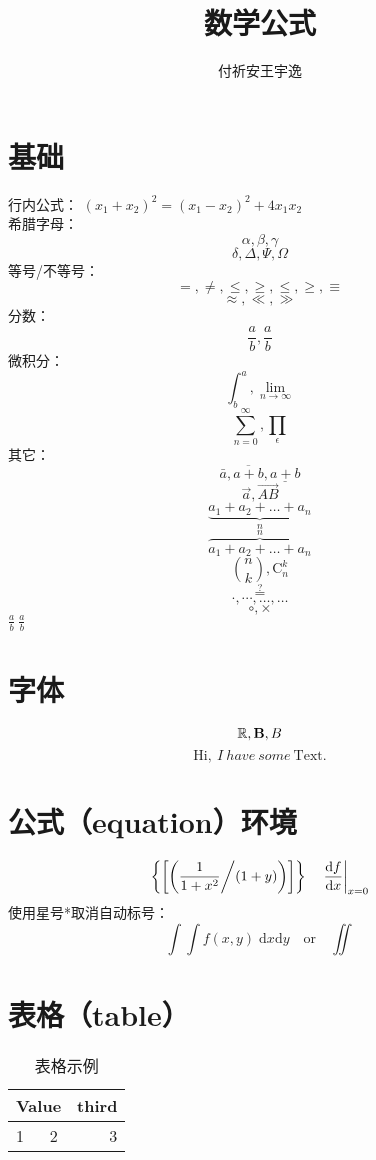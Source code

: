 \documentclass[12pt]{article}
\author{付祈安\quad 王宇逸}
\title{数学公式}
\begin{document}
\maketitle
\tableofcontents
\listoftables

\section{基础}
行内公式：
$ (x_1 + x_2)^2 = (x_1 - x_2)^2 + 4 x_1 x_2 $ \\
希腊字母：
\[ \alpha, \beta, \gamma \]
\[ \delta, \Delta, \Psi, \Omega \]
等号/不等号：
\[ =, \neq, \leq, \geq, \leqslant, \geqslant, \equiv \]
\[ \approx, \ll, \gg \]
分数：
\[ \frac{a}{b}, \frac ab \]
微积分：
\[ \int^a_b, \lim_{n \rightarrow \infty} \]
\[ \sum_{n=0}^{\infty}, \prod_\epsilon \]
其它：
\[ \bar{a}, \overline{a+b}, \underline{a+b} \]
\[ \vec{a}, \overrightarrow{AB} \]
\[ \underbrace{a_1+a_2+\ldots+a_n}_n \]
\[ \overbrace{a_1+a_2+\ldots+a_n}^n \]
\[ \binom{n}{k}, \mathrm{C}_n^k \]
\[ \stackrel{?}{=} \]
\[ \cdot, \cdots, \dots, \ldots \]
\[ \circ, \times \]
$ \frac ab\ {\displaystyle \frac ab} $
\section{字体}
\[ \mathbb{R}, \mathbf{B}, \boldmath{B} \]
\[ \mathrm{Hi},\ I\ have\ some\ \text{Text}. \]
\section{公式（equation）环境}
\begin{equation}
	\label{eq1}
	\left\{ \left[ \left( \frac{1}{1+x^2} \middle/ (1 + y) \right) \right] \right\}
	\quad \left. \frac{\mathrm{d}f}{\mathrm{d}x} \right|_{x = 0}
\end{equation}
使用星号*取消自动标号：
\begin{equation*}
	\int\!\!\!\int f(x, y) \; \mathrm{d} x \mathrm{d} y
	\quad \text{or} \quad \iint
\end{equation*}
\section{表格（table）}
\begin{table}[htbp]
	\begin{center}
		\begin{tabular}{|l|c|r|}
			\hline
			\multicolumn{2}{|c|}{Value} & third     \\ \hline
			1                           & 2     & 3 \\ \cline{1-1}
		\end{tabular}
		\caption{表格示例}
		\label{tab1}
	\end{center}
\end{table}
\end{document}
